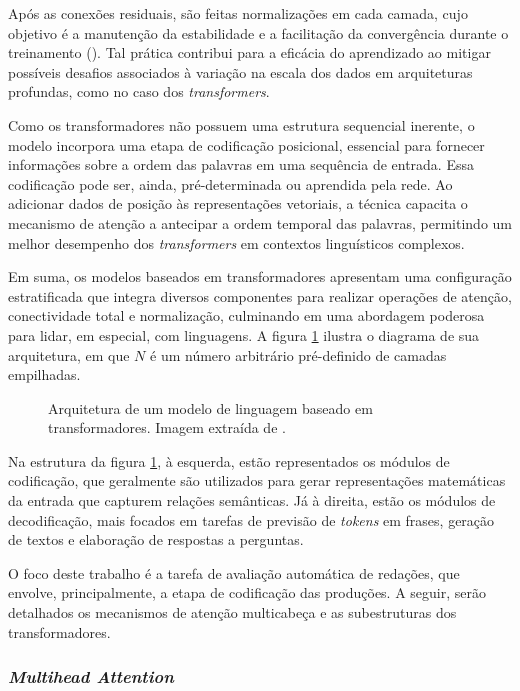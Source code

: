 Após as conexões residuais, são feitas normalizações em cada camada, cujo objetivo é a manutenção da estabilidade e a facilitação da convergência durante o treinamento (\cite{zhang2023dive}). Tal prática contribui para a eficácia do aprendizado ao mitigar possíveis desafios associados à variação na escala dos dados em arquiteturas profundas, como no caso dos \textit{transformers}.

Como os transformadores não possuem uma estrutura sequencial inerente, o modelo incorpora uma etapa de codificação posicional, essencial para fornecer informações sobre a ordem das palavras em uma sequência de entrada. Essa codificação pode ser, ainda, pré-determinada ou aprendida pela rede. Ao adicionar dados de posição às representações vetoriais, a técnica capacita o mecanismo de atenção a antecipar a ordem temporal das palavras, permitindo um melhor desempenho dos \textit{transformers} em contextos linguísticos complexos.

Em suma, os modelos baseados em transformadores apresentam uma configuração estratificada que integra diversos componentes para realizar operações de atenção, conectividade total e normalização, culminando em uma abordagem poderosa para lidar, em especial, com linguagens. A figura \ref{fig:transformer_architecture} ilustra o diagrama de sua arquitetura, em que $N$ é um número arbitrário pré-definido de camadas empilhadas.

\begin{figure}[H]
    \centering
    \caption{Arquitetura de um modelo de linguagem baseado em transformadores. Imagem extraída de \cite{attention2017}.}
    \label{fig:transformer_architecture}
    
\end{figure}

Na estrutura da figura \ref{fig:transformer_architecture}, à esquerda, estão representados os módulos de codificação, que geralmente são utilizados para gerar representações matemáticas da entrada que capturem relações semânticas. Já à direita, estão os módulos de decodificação, mais focados em tarefas de previsão de \textit{tokens} em frases, geração de textos e elaboração de respostas a perguntas.

O foco deste trabalho é a tarefa de avaliação automática de redações, que envolve, principalmente, a etapa de codificação das produções. A seguir, serão detalhados os mecanismos de atenção multicabeça e as subestruturas dos transformadores.

\subsubsection{\textit{Multihead Attention}}

